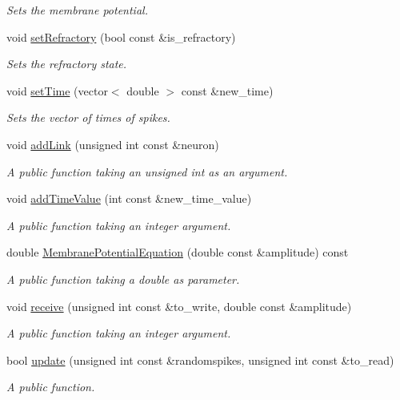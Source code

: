 \begin{DoxyCompactItemize}
\begin{DoxyCompactList}\small\item\em Sets the membrane potential. \end{DoxyCompactList}\item 
void \hyperlink{classNeuron_a32570ad7514c315829559378fbc359bc}{set\-Refractory} (bool const \&is\-\_\-refractory)
\begin{DoxyCompactList}\small\item\em Sets the refractory state. \end{DoxyCompactList}\item 
void \hyperlink{classNeuron_a3fd1e5b3fcc9c7a36ab78c330a29e4f8}{set\-Time} (vector$<$ double $>$ const \&new\-\_\-time)
\begin{DoxyCompactList}\small\item\em Sets the vector of times of spikes. \end{DoxyCompactList}\item 
void \hyperlink{classNeuron_a6468e6ea9f34e7ce0414018c0ca52a1c}{add\-Link} (unsigned int const \&neuron)
\begin{DoxyCompactList}\small\item\em A public function taking an unsigned int as an argument. \end{DoxyCompactList}\item 
void \hyperlink{classNeuron_a19391173c3640f1c41ede531574ef9be}{add\-Time\-Value} (int const \&new\-\_\-time\-\_\-value)
\begin{DoxyCompactList}\small\item\em A public function taking an integer argument. \end{DoxyCompactList}\item 
double \hyperlink{classNeuron_a3f673331282b347a4707eb7f8f20c34c}{Membrane\-Potential\-Equation} (double const \&amplitude) const 
\begin{DoxyCompactList}\small\item\em A public function taking a double as parameter. \end{DoxyCompactList}\item 
void \hyperlink{classNeuron_aa9a049a8a1f452535cea30b7f0c3f098}{receive} (unsigned int const \&to\-\_\-write, double const \&amplitude)
\begin{DoxyCompactList}\small\item\em A public function taking an integer argument. \end{DoxyCompactList}\item 
bool \hyperlink{classNeuron_a89ba2df0157a060f1c1be96479f7c3ed}{update} (unsigned int const \&randomspikes, unsigned int const \&to\-\_\-read)
\begin{DoxyCompactList}\small\item\em A public function. \end{DoxyCompactList}\end{DoxyCompactItemize}
